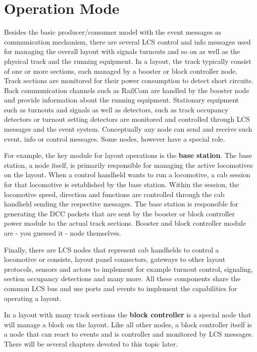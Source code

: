 \section{Operation Mode}

Besides the basic producer/consumer model with the event messages as communication mechanism, there are several LCS control and info messages used for managing the overall layout with signals turnouts and so on as well as the physical track and the running equipment. In a layout, the track typically consist of one or more sections, each managed by a booster or block controller node. Track sections are monitored for their power consumption to detect short circuits. Back communication channels such as RailCom are handled by the booster node and provide information about the running equipment. Stationary equipment such as turnouts and signals as well as detectors, such as track occupancy detectors or turnout setting detectors are monitored and controlled through LCS messages and the event system. Conceptually any node can send and receive such event, info or control messages. Some nodes, however have a special role.

For example, the key module for layout operations is the {\bf base station}. The base station, a node itself, is primarily responsible for managing the active locomotives on the layout. When a control handheld wants to run a locomotive, a cab session for that locomotive is established by the base station. Within the session, the locomotive speed, direction and functions are controlled through the cab handheld sending the respective messages. The base station is responsible for generating the DCC packets that are sent by the booster or block controller power module to the actual track sections. Booster and block controller module are - you guessed it - node themselves.

Finally, there are LCS nodes that represent cab handhelds to control a locomotive or consists, layout panel connectors, gateways to other layout protocols, sensors and actors to implement for example turnout control, signaling, section occupancy detections and many more. All these components share the common LCS bus and use ports and events to implement the capabilities for operating a layout.

In a layout with many track sections the {\bf block controller} is a special node that will manage a block on the layout. Like all other nodes, a block controller itself is a node that can react to events and is controller and monitored by LCS messages. There will be several chapters devoted to this topic later.

